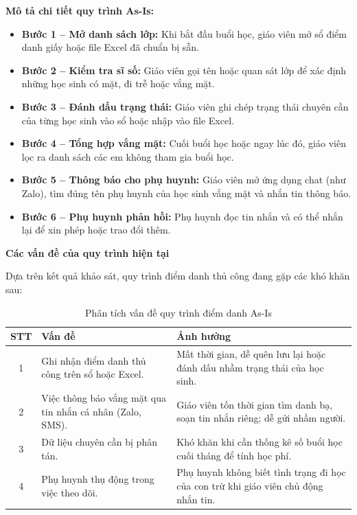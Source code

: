 \noindent \textbf{Mô tả chi tiết quy trình As-Is:}
\begin{itemize}
    \item \textbf{Bước 1 – Mở danh sách lớp:} Khi bắt đầu buổi học, giáo viên mở sổ điểm danh giấy hoặc file Excel đã chuẩn bị sẵn.
    \item \textbf{Bước 2 – Kiểm tra sĩ số:} Giáo viên gọi tên hoặc quan sát lớp để xác định những học sinh có mặt, đi trễ hoặc vắng mặt.
    \item \textbf{Bước 3 – Đánh dấu trạng thái:} Giáo viên ghi chép trạng thái chuyên cần của từng học sinh vào sổ hoặc nhập vào file Excel.
    \item \textbf{Bước 4 – Tổng hợp vắng mặt:} Cuối buổi học hoặc ngay lúc đó, giáo viên lọc ra danh sách các em không tham gia buổi học.
    \item \textbf{Bước 5 – Thông báo cho phụ huynh:} Giáo viên mở ứng dụng chat (như Zalo), tìm đúng tên phụ huynh của học sinh vắng mặt và nhắn tin thông báo.
     \item \textbf{Bước 6 – Phụ huynh phản hồi:} Phụ huynh đọc tin nhắn và có thể nhắn lại để xin phép hoặc trao đổi thêm.
\end{itemize}

\noindent \textbf {Các vấn đề của quy trình hiện tại}

Dựa trên kết quả khảo sát, quy trình điểm danh thủ công đang gặp các khó khăn sau:
\begin{table}[htbp]
    \centering
    \caption{Phân tích vấn đề quy trình điểm danh As-Is}
    \renewcommand{\arraystretch}{1.5}
    \begin{tabular}{|c|p{5cm}|p{6.5cm}|}
        \hline
        \textbf{STT} & \textbf{Vấn đề} & \textbf{Ảnh hưởng} \\ \hline
        1 & Ghi nhận điểm danh thủ công trên sổ hoặc Excel. & Mất thời gian, dễ quên lưu lại hoặc đánh dấu nhầm trạng thái của học sinh. \\ \hline
        2 & Việc thông báo vắng mặt qua tin nhắn cá nhân (Zalo, SMS). & Giáo viên tốn thời gian tìm danh bạ, soạn tin nhắn riêng; dễ gửi nhầm người. \\ \hline
        3 & Dữ liệu chuyên cần bị phân tán. & Khó khăn khi cần thống kê số buổi học cuối tháng để tính học phí. \\ \hline
        4 & Phụ huynh thụ động trong việc theo dõi. & Phụ huynh không biết tình trạng đi học của con trừ khi giáo viên chủ động nhắn tin. \\ \hline
    \end{tabular}
\end{table}
